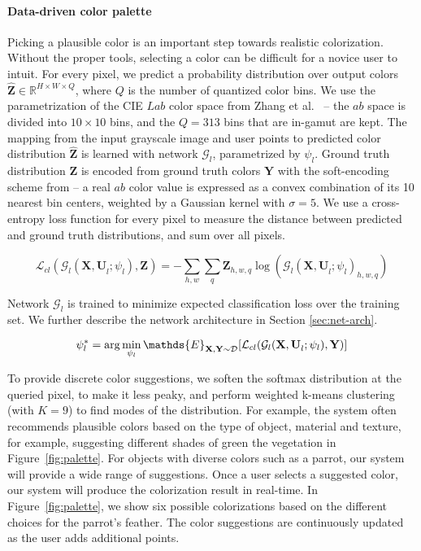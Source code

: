 \documentclass[acmtog,authorversion]{acmart}
\begin{document}
\paragraph{Data-driven color palette} Picking a plausible color is an important step towards realistic colorization. Without the proper tools, selecting a color can be difficult for a novice user to intuit. For every pixel, we predict a probability distribution over output colors $\mathbf{\widehat{Z}} \in \mathds{R}^{H\times W \times Q}$, where $Q$ is the number of quantized color bins. We use the parametrization of the CIE $Lab$ color space from Zhang et al.~ -- the $ab$ space is divided into $10\times 10$ bins, and the $Q=313$ bins that are in-gamut are kept. The mapping from the input grayscale image and user points to predicted color distribution $\mathbf{\widehat{Z}}$ is learned with network $\mathcal{G}_l$, parametrized by $\psi_l$. Ground truth distribution $\mathbf{Z}$ is encoded from ground truth colors $\mathbf{Y}$ with the soft-encoding scheme from \cite{zhang2016colorful} -- a real $ab$ color value is expressed as a convex combination of its 10 nearest bin centers, weighted by a Gaussian kernel with $\sigma=5$. We use a cross-entropy loss function for every pixel to measure the distance between predicted and ground truth distributions, and sum over all pixels.

\vspace{-2mm}
\begin{equation}
\mathcal{L}_{cl}(\mathcal{G}_l(\mathbf{X,U}_l;\psi_l),\mathbf{Z}) = - \sum_{h,w}\sum_{q} \mathbf{Z}_{h,w,q} \log (\mathcal{G}_l(\mathbf{X,U}_l;\psi_l)_{h,w,q})
\label{eqn:classloss}
\end{equation}

Network $\mathcal{G}_l$ is trained to minimize expected classification loss over the training set. We further describe the network architecture in Section \ref{sec:net-arch}.

\vspace{-2mm}
\begin{equation}
\psi_l^{*} = \arg\min_{\psi_l} \mathds{E}_{\mathbf{X},\mathbf{Y}\sim \mathcal{D}} [ \mathcal{L}_{cl}(\mathcal{G}_l(\mathbf{X,U}_l;\psi_l),\mathbf{Y}) ] \\
\label{eqn:minG}
\end{equation}

To provide discrete color suggestions, we soften the softmax distribution at the queried pixel, to make it less peaky, and perform weighted k-means clustering (with $K=9$) to find modes of the distribution. For example, the system often recommends plausible colors based on the type of object, material and texture, for example, suggesting different shades of green the vegetation in Figure~\ref{fig:palette}. For objects with diverse colors such as a parrot, our system will provide a wide range of suggestions. Once a user selects a suggested color, our system will produce the colorization result in real-time. In Figure~\ref{fig:palette}, we show six possible colorizations based on the different choices for the parrot's feather. The color suggestions are continuously updated as the user adds additional points.
\end{document}
